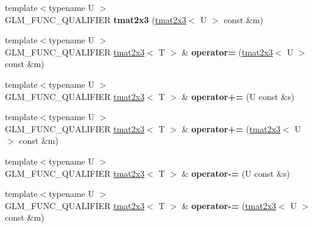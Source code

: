 \begin{DoxyCompactItemize}
\item 
\hypertarget{structglm_1_1detail_1_1tmat2x3_a06321f59c5841374f5e068e295a3c29f}{}{\footnotesize template$<$typename U $>$ }\\G\+L\+M\+\_\+\+F\+U\+N\+C\+\_\+\+Q\+U\+A\+L\+I\+F\+I\+E\+R {\bfseries tmat2x3} (\hyperlink{structglm_1_1detail_1_1tmat2x3}{tmat2x3}$<$ U $>$ const \&m)\label{structglm_1_1detail_1_1tmat2x3_a06321f59c5841374f5e068e295a3c29f}

\item 
\hypertarget{structglm_1_1detail_1_1tmat2x3_a9b4788b08ea0e0c8eccd99493c992b61}{}{\footnotesize template$<$typename U $>$ }\\G\+L\+M\+\_\+\+F\+U\+N\+C\+\_\+\+Q\+U\+A\+L\+I\+F\+I\+E\+R \hyperlink{structglm_1_1detail_1_1tmat2x3}{tmat2x3}$<$ T $>$ \& {\bfseries operator=} (\hyperlink{structglm_1_1detail_1_1tmat2x3}{tmat2x3}$<$ U $>$ const \&m)\label{structglm_1_1detail_1_1tmat2x3_a9b4788b08ea0e0c8eccd99493c992b61}

\item 
\hypertarget{structglm_1_1detail_1_1tmat2x3_a72883b586f1bff7fdf53120a6b0f2eeb}{}{\footnotesize template$<$typename U $>$ }\\G\+L\+M\+\_\+\+F\+U\+N\+C\+\_\+\+Q\+U\+A\+L\+I\+F\+I\+E\+R \hyperlink{structglm_1_1detail_1_1tmat2x3}{tmat2x3}$<$ T $>$ \& {\bfseries operator+=} (U const \&s)\label{structglm_1_1detail_1_1tmat2x3_a72883b586f1bff7fdf53120a6b0f2eeb}

\item 
\hypertarget{structglm_1_1detail_1_1tmat2x3_a06f471d9051fcb92b1ec94eb3aea08fa}{}{\footnotesize template$<$typename U $>$ }\\G\+L\+M\+\_\+\+F\+U\+N\+C\+\_\+\+Q\+U\+A\+L\+I\+F\+I\+E\+R \hyperlink{structglm_1_1detail_1_1tmat2x3}{tmat2x3}$<$ T $>$ \& {\bfseries operator+=} (\hyperlink{structglm_1_1detail_1_1tmat2x3}{tmat2x3}$<$ U $>$ const \&m)\label{structglm_1_1detail_1_1tmat2x3_a06f471d9051fcb92b1ec94eb3aea08fa}

\item 
\hypertarget{structglm_1_1detail_1_1tmat2x3_a41dd674efebd954f906852a8adbb2106}{}{\footnotesize template$<$typename U $>$ }\\G\+L\+M\+\_\+\+F\+U\+N\+C\+\_\+\+Q\+U\+A\+L\+I\+F\+I\+E\+R \hyperlink{structglm_1_1detail_1_1tmat2x3}{tmat2x3}$<$ T $>$ \& {\bfseries operator-\/=} (U const \&s)\label{structglm_1_1detail_1_1tmat2x3_a41dd674efebd954f906852a8adbb2106}

\item 
\hypertarget{structglm_1_1detail_1_1tmat2x3_a4852d2c3699db52c0c80622ca6790abc}{}{\footnotesize template$<$typename U $>$ }\\G\+L\+M\+\_\+\+F\+U\+N\+C\+\_\+\+Q\+U\+A\+L\+I\+F\+I\+E\+R \hyperlink{structglm_1_1detail_1_1tmat2x3}{tmat2x3}$<$ T $>$ \& {\bfseries operator-\/=} (\hyperlink{structglm_1_1detail_1_1tmat2x3}{tmat2x3}$<$ U $>$ const \&m)\label{structglm_1_1detail_1_1tmat2x3_a4852d2c3699db52c0c80622ca6790abc}


\end{DoxyCompactItemize}
